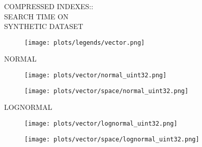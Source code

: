 \documentclass{article}
\begin{document}
\begin{figure}[!htbp]
\fbox
{
\begin{minipage}[t][0.98\textheight][t]{\textwidth}
\centering
\vspace*{-0.2cm}
\begin{minipage}{0.23\linewidth}
    \footnotesize{COMPRESSED INDEXES::\\SEARCH TIME ON \\ SYNTHETIC DATASET}
    \end{minipage}
   \begin{minipage}{0.75\linewidth}
        \begin{figure}[H]
        \texttt{[image: plots/legends/vector.png]}
        \end{figure}
    \end{minipage}

    \begin{minipage}{0.03\linewidth}
    \begin{sideways}\small NORMAL\end{sideways}
    \end{minipage}
    \begin{minipage}{0.32\linewidth}
        \begin{figure}[H]
        \texttt{[image: plots/vector/normal\_uint32.png]}
        \end{figure}
    \end{minipage}
    \begin{minipage}{0.32\linewidth}
        \begin{figure}[H]
            \texttt{[image: plots/vector/space/normal\_uint32.png]}
        \end{figure}
    \end{minipage}
    \vspace*{-15px}

    \begin{minipage}{0.03\linewidth}
    \begin{sideways}\small LOGNORMAL\end{sideways}
    \end{minipage}
    \begin{minipage}{0.32\linewidth}
        \begin{figure}[H]
        \texttt{[image: plots/vector/lognormal\_uint32.png]}
        \end{figure}
    \end{minipage}
    \begin{minipage}{0.32\linewidth}
        \begin{figure}[H]
            \texttt{[image: plots/vector/space/lognormal\_uint32.png]}
        \end{figure}
    \end{minipage}
    \vspace*{-15px}


\end{minipage}}
\end{figure}
\end{document}
